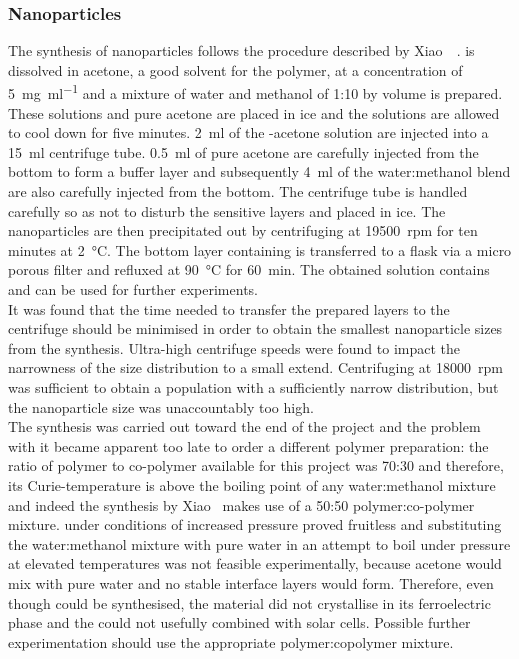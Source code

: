 \subsubsection{\pvtr{} Nanoparticles}
The synthesis of \pvtr{} nanoparticles follows the procedure described by Xiao~\etal{}~\cite{NPsynthesis}. \pvtr{} is dissolved in acetone, a good solvent for the polymer, at a concentration of \SI{5}{\milli\gram\per\milli\litre} and a mixture of water and methanol of 1:10 by volume is prepared. These solutions and pure acetone are placed in ice and the solutions are allowed to cool down for five minutes. \SI{2}{\milli\litre} of the \pvtr{}-acetone solution are injected into a \SI{15}{\milli\litre} centrifuge tube. \SI{0.5}{\milli\litre} of pure acetone are carefully injected from the bottom to form a buffer layer and subsequently \SI{4}{\milli\litre} of the water:methanol blend are also carefully injected from the bottom. The centrifuge tube is handled carefully so as not to disturb the sensitive layers and placed in ice. The nanoparticles are then precipitated out by centrifuging at \SI{19500}{rpm} for ten minutes at \SI{2}{\degreeCelsius}. The bottom layer containing \nps{} is transferred to a flask via a micro porous filter and refluxed at \SI{90}{\degreeCelsius} for \SI{60}{\minute}. The obtained solution contains \pvtr{} \nps{} and can be used for further experiments.\\
It was found that the time needed to transfer the prepared layers to the centrifuge should be minimised in order to obtain the smallest nanoparticle sizes from the synthesis. Ultra-high centrifuge speeds were found to impact the narrowness of the size distribution to a small extend. Centrifuging at \SI{18000}{rpm} was sufficient to obtain a population with a sufficiently narrow distribution, but the nanoparticle size was unaccountably too high.\\
The synthesis was carried out toward the end of the project and the problem with it became apparent too late to order a different polymer preparation: the ratio of polymer to co-polymer available for this project was 70:30 and therefore, its Curie-temperature is above the boiling point of any water:methanol mixture and indeed the synthesis by Xiao~\etal{} makes use of a 50:50 polymer:co-polymer mixture.  under conditions of increased pressure proved fruitless and substituting the water:methanol mixture with pure water in an attempt to boil under pressure at elevated temperatures was not feasible experimentally, because acetone would mix with pure water and no stable interface layers would form. Therefore, even though \nps{} could be synthesised, the material did not crystallise in its ferroelectric phase and the \nps{} could not usefully combined with solar cells. Possible further experimentation should use the appropriate polymer:copolymer mixture.
